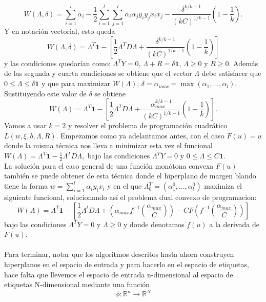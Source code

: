 \[ W(\Lambda,\delta)= \sum_{i=1}^l \alpha_i - \frac{1}{2}\sum_{i=1}^l \sum_{j=1}^l \alpha_i \alpha_j y_i y_j x_i x_j - \frac{\delta^{k/k-1}}{(kC)^{1/k-1}} \left( 1- \frac{1}{k} \right). \]
Y en notación vectorial, esto queda
\[ W(\Lambda,\delta)=\Lambda^T\textbf{1} - \left[ \frac{1}{2} \Lambda^TD\Lambda + \frac{\delta^{k/k-1}}{(kC)^{1/k-1}} \left( 1- \frac{1}{k} \right) \right] \]
y las condiciones quedarían como: $\Lambda^TY=0$, $\Lambda+R=\delta \textbf{1}$, $\Lambda \geq 0$ y $R \geq 0$. Además de las segunda y cuarta condiciones se obtiene que el vector $\Lambda$ debe satisfacer que $0 \leq \Lambda \leq \delta \textbf{1}$ y que para maximizar $W(\Lambda)$, $\delta=\alpha_{max}=\max(\alpha_1,...,\alpha_l)$. Sustituyendo este valor de $\delta$ se obtiene
\[ W(\Lambda)= \Lambda^T\textbf{1} - \left[ \frac{1}{2} \Lambda^TD\Lambda + \frac{\alpha_{max}^{k/k-1}}{(kC)^{1/k-1}} \left( 1- \frac{1}{k} \right) \right]. \]
Vamos a usar $k=2$ y resolver el problema de programación cuadrático $L(w,\xi,b,\Lambda,R)$. Empezamos como ya adelantamos antes, con el caso $F(u)=u$ donde la misma técnica nos lleva a minimizar esta vez el funcional $W(\Lambda)=\Lambda^T\textbf{1} - \frac{1}{2} \Lambda^TD\Lambda,$ bajo las condiciones $\Lambda^TY=0$ y $0 \leq \Lambda \leq C\textbf{1}$.\\
La solución para el caso general de una función monótona convexa $F(u)$ también se puede obtener de esta técnica donde el hiperplano de margen blando tiene la forma $w=\sum_{i=1}^l \alpha_i y_i x_i$ y en el que $\Lambda^T_0=(\alpha^0_1,...,\alpha_l^0)$ maximiza el siguiente funcional, solucionando así el problema dual convexo de programacion:
\[ W(\Lambda)=\Lambda^T\textbf{1} - \left[ \frac{1}{2}\Lambda^tD\Lambda + \left( \alpha_{max}f^{-1} \left( \frac{\alpha_{max}}{C} \right) \right)- CF \left(f^{-1} \left( \frac{\alpha_{max}}{C} \right) \right) \right] \]
bajo las condiciones $\Lambda^TY=0$ y $\Lambda \geq 0$ y donde denotamos $f(u)$ a la derivada de $F(u)$.\cite{cortes1995support}\\\\
Para terminar, notar que los algoritmos descritos hasta ahora construyen hiperplanos en el espacio de entrada y para hacerlo en el espacio de etiquetas, hace falta que llevemos el espacio de entrada n-dimensional al espacio de etiquetas N-dimensional mediante una función 
\[ \phi: \mathbb{R}^n \rightarrow \mathbb{R}^N \]









































\endinput











